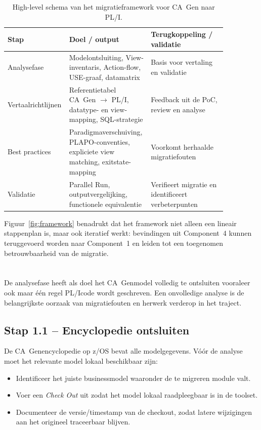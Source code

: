 \begin{table}[h]
\centering
\caption[Schema migratieframework]{High-level schema van het migratieframework voor CA~Gen naar PL/I.}
\label{tab:framework-schema}
\small
\begin{tabular}{|p{0.18\linewidth}|p{0.34\linewidth}|p{0.34\linewidth}|}
\hline
\textbf{Stap} & \textbf{Doel / output} & \textbf{Terugkoppeling / validatie} \\
\hline
Analysefase & Modelontsluiting, View-inventaris, Action-flow, USE-graaf, datamatrix & Basis voor vertaling en validatie \\
\hline
Vertaalrichtlijnen & Referentietabel CA~Gen $\rightarrow$ PL/I, datatype- en view-mapping, SQL-strategie & Feedback uit de PoC, review en analyse \\
\hline
Best practices & Paradigmaverschuiving, PLAPO-conventies, expliciete view matching, exitstate-mapping & Voorkomt herhaalde migratiefouten \\
\hline
Validatie & Parallel Run, outputvergelijking, functionele equivalentie & Verifieert migratie en identificeert verbeterpunten \\
\hline
\end{tabular}
\end{table}

Figuur~\ref{fig:framework} benadrukt dat het framework niet alleen een lineair stappenplan is, maar ook iteratief werkt: bevindingen uit Component~4 kunnen teruggevoerd worden naar Component~1 en leiden tot een toegenomen betrouwbaarheid van de migratie.

\section{}%
\label{sec:component-analyse}

De analysefase heeft als doel het CA~Gen\-model volledig te ontsluiten vooraleer ook maar één regel 
PL/I\-code wordt geschreven. Een onvolledige analyse is de belangrijkste oorzaak van migratiefouten en 
herwerk verderop in het traject.

\subsection{Stap 1.1 -- Encyclopedie ontsluiten}
\label{subsec:stap-encyclopedie}

De CA~Gen\-encyclopedie op z/OS bevat alle modelgegevens. Vóór de analyse moet het relevante model lokaal 
beschikbaar zijn:
\begin{itemize}
    \item Identificeer het juiste businessmodel waaronder de te migreren module valt.
    \item Voer een \emph{Check Out} uit zodat het model lokaal raadpleegbaar is in de toolset.
    \item Documenteer de versie\-/timestamp van de check\-out, zodat latere wijzigingen aan het origineel 
    traceerbaar blijven.
\end{itemize}

